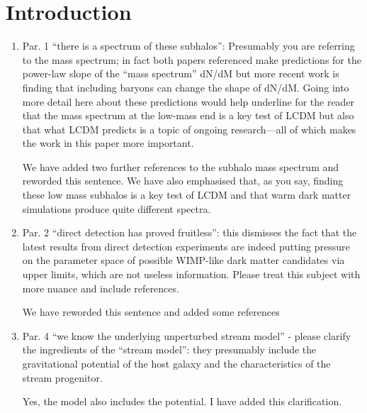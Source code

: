 \documentclass{article}
\begin{document}
\section{Introduction}

\begin{enumerate}
\item Par. 1
“there is a spectrum of these subhalos”: Presumably you are referring to the mass
spectrum; in fact both papers referenced make predictions for the power-law slope of
the “mass spectrum” dN/dM but more recent work is finding that including baryons can
change the shape of dN/dM. Going into more detail here about these predictions would
help underline for the reader that the mass spectrum at the low-mass end is a key test
of LCDM but also that what LCDM predicts is a topic of ongoing research—all of which
makes the work in this paper more important.

{\color{red} We have added two further references to the subhalo mass spectrum and reworded this sentence. We have also emphasised that, as you say, finding these low mass subhalos is a key test of LCDM and that warm dark matter simulations produce quite different spectra.}

\item Par. 2
“direct detection has proved fruitless”: this dismisses the fact that the latest results from
direct detection experiments are indeed putting pressure on the parameter space of
possible WIMP-like dark matter candidates via upper limits, which are not useless
information. Please treat this subject with more nuance and include references.

{\color{red} We have reworded this sentence and added some references}


\item Par. 4
“we know the underlying unperturbed stream model” - please clarify the ingredients of
the “stream model”: they presumably include the gravitational potential of the host
galaxy and the characteristics of the stream progenitor.

{\color{red} Yes, the model also includes the potential. I have added this clarification.}

\end{enumerate}
\end{document}
